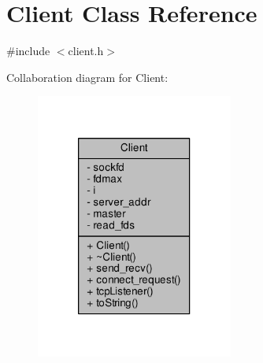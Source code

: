 \hypertarget{class_client}{}\section{Client Class Reference}
\label{class_client}


{\ttfamily \#include $<$client.\+h$>$}



Collaboration diagram for Client\+:
\nopagebreak
\begin{figure}[H]
\begin{center}
\leavevmode
\includegraphics[width=184pt]{class_client__coll__graph}
\end{center}
\end{figure}
